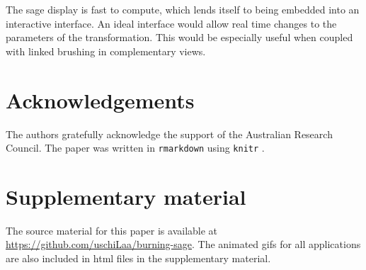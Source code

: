 \documentclass[]{interact}
\theoremstyle{plain}%
\theoremstyle{definition}
\theoremstyle{remark}
\begin{document}
The sage display is fast to compute, which lends itself to being
embedded into an interactive interface. An ideal interface would allow
real time changes to the parameters of the transformation. This would be
especially useful when coupled with linked brushing in complementary
views.

\hypertarget{acknowledgements}{%
\section*{Acknowledgements}\label{acknowledgements}}

The authors gratefully acknowledge the support of the Australian
Research Council. The paper was written in \texttt{rmarkdown}
\citep{rmarkdown} using \texttt{knitr} \citep{knitr}.

\hypertarget{supplementary-material}{%
\section*{Supplementary material}\label{supplementary-material}}

The source material for this paper is available at
\url{https://github.com/uschiLaa/burning-sage}. The animated gifs for
all applications are also included in html files in the supplementary
material.



\end{document}
